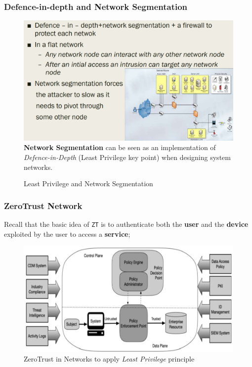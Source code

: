\subsubsection{Defence-in-depth and Network Segmentation}
\begin{figure}[htbp]
   \centering
   \includegraphics{images/leastprivilege_networkseg.png}\\
   \textbf{Network Segmentation} can be seen as an implementation of \textit{Defence-in-Depth} (Least Privilege key point) when designing system networks.
   \caption{Least Privilege and Network Segmentation}
   \label{fig:leastprivilege_networkseg}
\end{figure}

\subsubsection{ZeroTrust Network}

Recall that the basic idea of \texttt{ZT} is to authenticate both the \textbf{user} and the \textbf{device} exploited by the user to access a \textbf{service};

\begin{figure}[htbp]
   \centering
   \includegraphics{images/leastprivilege_zerotrust.png}
   \caption{ZeroTrust in Networks to apply \textit{Least Privilege} principle}
   \label{fig:leastprivilege_zerotrust}
\end{figure}

